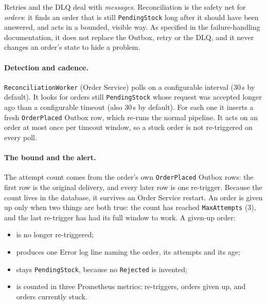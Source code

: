 \documentclass[a4paper]{report}
\begin{document}
Retries and the DLQ deal with \emph{messages}. Reconciliation is the safety
net for \emph{orders}: it finds an order that is still
\texttt{PendingStock} long after it should have been answered, and acts in a
bounded, visible way. As specified in the failure-handling documentation, it
does not replace the Outbox, retry or the DLQ, and it never changes an order's
state to hide a problem.

\paragraph{Detection and cadence.} \texttt{ReconciliationWorker} (Order
Service) polls on a configurable interval (30\,s by default). It looks for
orders still \texttt{PendingStock} whose request was accepted longer ago than
a configurable timeout (also 30\,s by default). For each one it inserts
a fresh \texttt{OrderPlaced} Outbox row, which re-runs the normal pipeline. It
acts on an order at most once per timeout window, so a stuck order is not
re-triggered on every poll.

\paragraph{The bound and the alert.} The attempt count comes from the order's
own \texttt{OrderPlaced} Outbox rows: the first row is the original delivery,
and every later row is one re-trigger. Because the count lives in the
database, it survives an Order Service restart. An order is given up only
when two things are both true: the count has reached \texttt{MaxAttempts}
(3), and the last re-trigger has had its full window to work. A given-up
order:
\begin{itemize}
  \item is no longer re-triggered;
  \item produces one Error log line naming the order, its attempts and its
    age;
  \item stays \texttt{PendingStock}, because no \texttt{Rejected} is invented;
  \item is counted in three Prometheus metrics: re-triggers, orders given
    up, and orders currently stuck.
\end{itemize}
\end{document}
